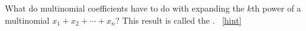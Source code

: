 \documentclass{book}
\begin{document}
\setcounter{project}{284}
\addtocounter{project}{-1}
\begin{activity}[]\label{activity-277}
\hypertarget{p-1489}{}%
What do multinomial coefficients have to do with expanding the \(k\)th power of a multinomial \(x_1+x_2+\cdots+x_n\)? This result is called the .%
~\hfill{\tiny\hyperlink{a-284}{[hint]}\hypertarget{q-284}{}}\end{activity}
\end{document}
